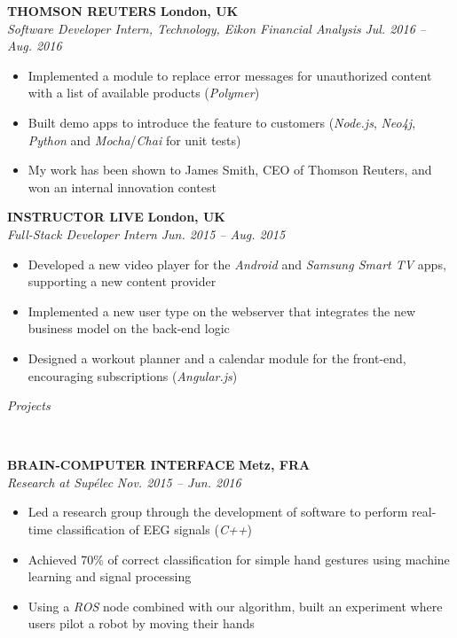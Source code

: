 \documentclass[a4paper, 12pt]{article}
\newcommand{\marginline}{-0.3cm}
\newcommand{\margincontent}{-0.6cm}
\newcommand{\marginbeforesection}{0.35cm}
\newcommand{\linewidthperso}{0.02cm}
\newcommand{\styletitle}[1]{\textbf{#1}}
\newcommand{\styledesc}[1]{\textit{#1}}
\newcommand{\styleloc}[1]{\textbf{#1}}
\newcommand{\styledates}[1]{\textit{#1}}
\newcommand{\stylesection}[1]{
  \vspace{\marginbeforesection}
  \begin{normalsize}\textit{#1}\end{normalsize}
  \vspace{\marginline}\\
  \noindent\makebox[\linewidth]{\rule{\textwidth}{\linewidthperso}}

}
\begin{document}
\begin{footnotesize}
\styletitle{THOMSON REUTERS} \hfill \styleloc{London, UK}\\
\styledesc{Software Developer Intern, Technology, Eikon Financial Analysis} \hfill \styledates{Jul. 2016 -- Aug. 2016}\\
\vspace{\margincontent}
\begin{itemize}
  \item Implemented a module to replace error messages for unauthorized content with a list of available products (\textit{Polymer})
  \item Built demo apps to introduce the feature to customers (\textit{Node.js}, \textit{Neo4j}, \textit{Python} and \textit{Mocha}/\textit{Chai} for unit tests)
  \item My work has been shown to James Smith, CEO of Thomson Reuters, and won an internal innovation contest
\end{itemize}

\styletitle{INSTRUCTOR LIVE} \hfill \styleloc{London, UK}\\
\styledesc{Full-Stack Developer Intern} \hfill \styledates{Jun. 2015 -- Aug. 2015}\\
\vspace{\margincontent}
\begin{itemize}
  \item Developed a new video player for the \textit{Android} and \textit{Samsung Smart TV} apps, supporting a new content provider
  \item Implemented a new user type on the webserver that integrates the new business model on the back-end logic
  \item Designed a workout planner and a calendar module for the front-end, encouraging subscriptions (\textit{Angular.js})
\end{itemize}

\stylesection{Projects}

\styletitle{BRAIN-COMPUTER INTERFACE} \hfill \styleloc{Metz, FRA}\\
\styledesc{Research at Sup\'elec} \hfill \styledates{Nov. 2015 -- Jun. 2016}\\
\vspace{\margincontent}
\begin{itemize}
  \item Led a research group through the development of software to perform real-time classification of EEG signals (\textit{C++})
  \item Achieved 70\% of correct classification for simple hand gestures using machine learning and signal processing
  \item Using a \textit{ROS} node combined with our algorithm, built an experiment where users pilot a robot by moving their hands
\end{itemize}


\end{footnotesize}
\end{document}

